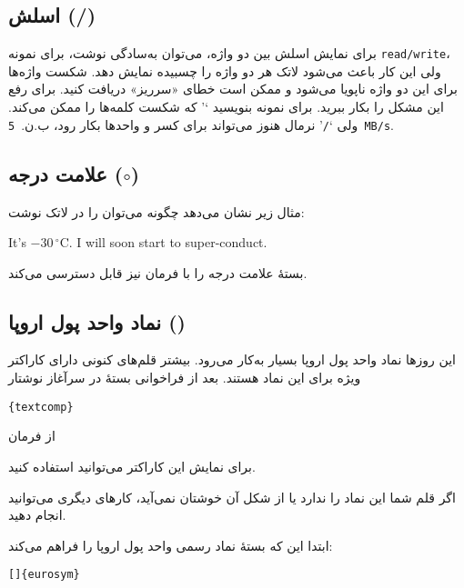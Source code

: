 \subsection{\texorpdfstring{اسلش (/)}{اسلش}}  
برای نمایش اسلش بین دو واژه، می‌توان به‌سادگی نوشت، برای نمونه 
\texttt{read/write}، 
ولی این کار باعث می‌شود لاتک هر دو واژه را چسبیده نمایش دهد. شکست واژه‌ها برای این دو واژه ناپویا می‌شود و ممکن است خطای «سرریز» دریافت کنید. برای رفع این مشکل  را بکار ببرید. برای نمونه بنویسید `' که شکست کلمه‌ها را ممکن می‌کند. ولی `\texttt{/}' نرمال هنوز می‌تواند برای کسر و واحدها بکار رود، ب.ن.\ \texttt{5 MB/s}.

\subsection{\texorpdfstring{علامت درجه ($\circ$)}{علامت درجه}}
مثال زیر نشان می‌دهد چگونه می‌توان  
 را در لاتک نوشت:


\begin{example}
It's $-30\,^{\circ}\mathrm{C}$.
I will soon start to
super-conduct.
\end{example}


بستهٔ  علامت درجه را با فرمان   نیز قابل دسترسی می‌کند.
\subsection{\texorpdfstring{نماد واحد پول اروپا (\lr{\texteuro})}{نماد واحد پول اروپا}}
این روزها نماد واحد پول اروپا بسیار به‌کار می‌رود. بیشتر قلم‌‌های کنونی دارای کاراکتر ویژه برای این نماد هستند. بعد از فراخوانی بستهٔ 
در سرآغاز نوشتار

\begin{lscommand}
\verb|{textcomp}| 
\end{lscommand}

از فرمان 

\begin{lscommand}
\end{lscommand}

برای نمایش این کاراکتر می‌توانید استفاده کنید.

اگر قلم شما این نماد را ندارد یا از شکل آن خوشتان نمی‌آید، کارهای دیگری می‌توانید انجام دهید.

ابتدا این که بستهٔ
نماد رسمی واحد پول اروپا را فراهم می‌کند:

\begin{lscommand}
\verb|[|\verb|]{eurosym}|
\end{lscommand}


